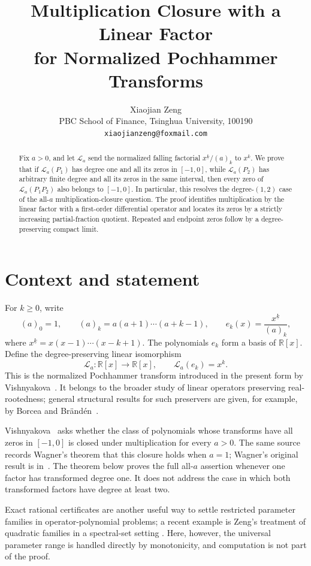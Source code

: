 \documentclass[11pt]{article}
\title{Multiplication Closure with a Linear Factor\\
for Normalized Pochhammer Transforms}
\author{Xiaojian Zeng\\
\small PBC School of Finance, Tsinghua University, 100190\\
\small \texttt{xiaojianzeng@foxmail.com}}
\date{}
\newcommand{\RR}{\mathbb{R}}
\newcommand{\La}{\mathcal{L}_a}
\begin{document}
\maketitle

\begin{abstract}
Fix $a>0$, and let $\mathcal L_a$ send the normalized falling factorial
$x^{\underline{k}}/(a)_k$ to $x^k$.  We prove that if
$\mathcal L_a(P_1)$ has degree one and all its zeros in $[-1,0]$, while
$\mathcal L_a(P_2)$ has arbitrary finite degree and all its zeros in the
same interval, then every zero of $\mathcal L_a(P_1P_2)$ also belongs to
$[-1,0]$.  In particular, this resolves the degree-$(1,2)$ case of the
all-$a$ multiplication-closure question.  The proof identifies multiplication
by the linear factor with a first-order differential operator and locates its
zeros by a strictly increasing partial-fraction quotient.  Repeated and
endpoint zeros follow by a degree-preserving compact limit.
\end{abstract}

\section{Context and statement}

For $k\geq 0$, write
\[
 (a)_0=1,\qquad (a)_k=a(a+1)\cdots(a+k-1),\qquad
 e_k(x)=\frac{x^{\underline{k}}}{(a)_k},
\]
where $x^{\underline{k}}=x(x-1)\cdots(x-k+1)$.  The polynomials
$e_k$ form a basis of $\RR[x]$.  Define the degree-preserving linear
isomorphism
\[
 \La:\RR[x]\longrightarrow\RR[x],\qquad \La(e_k)=x^k.
\]
This is the normalized Pochhammer transform introduced in the present form
by Vishnyakova~\cite{Vishnyakova2026}.  It belongs to the broader study of
linear operators preserving real-rootedness; general structural results for
such preservers are given, for example, by Borcea and
Brändén~\cite{BorceaBranden2009}.

Vishnyakova~\cite[Definition~1.4 and Open Problem~1.9]{Vishnyakova2026}
asks whether the class of polynomials whose transforms have all zeros in
$[-1,0]$ is closed under multiplication for every $a>0$.  The same source
records Wagner's theorem that this closure holds when $a=1$; Wagner's
original result is in~\cite{Wagner1992}.  The theorem below proves the full
all-$a$ assertion whenever one factor has transformed degree one.  It does
not address the case in which both transformed factors have degree at least
two.

Exact rational certificates are another useful way to settle restricted
parameter families in operator-polynomial problems; a recent example is
Zeng's treatment of quadratic families in a spectral-set setting
\cite{Zeng2026Lens}.  Here, however, the universal parameter range is handled
directly by monotonicity, and computation is not part of the proof.
\end{document}
